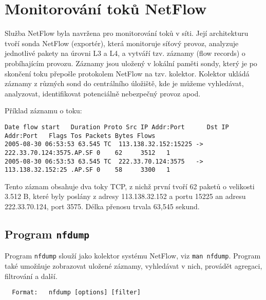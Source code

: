  \newpage
\section{Monitorování toků NetFlow}\label{netflow}
Služba NetFlow byla navržena pro monitorování toků v síti. Její architekturu tvoří sonda NetFlow (exportér), která monitoruje síťový provoz, analyzuje jednotlivé pakety na úrovni L3 a L4, a vytváří tzv. záznamy (flow records) o probíhajícím provozu. Záznamy jsou uložený v lokální paměti sondy, který je po skončení toku přepošle protokolem NetFlow na tzv. kolektor. Kolektor ukládá záznamy z různých sond do centrálního úložiště, kde je můžeme vyhledávat, analyzovat, identifikovat potenciálně nebezpečný provoz apod.

Příklad záznamu o toku:
{\footnotesize
\begin{verbatim}
Date flow start   Duration Proto Src IP Addr:Port      Dst IP Addr:Port   Flags Tos Packets Bytes Flows
2005-08-30 06:53:53 63.545 TC  113.138.32.152:15225 ->  222.33.70.124:3575.AP.SF 0    62     3512   1
2005-08-30 06:53:53 63.545 TC  222.33.70.124:3575   ->  113.138.32.152:25 .AP.SF 0    58     3300   1
\end{verbatim}
}
Tento záznam obsahuje dva toky TCP, z nichž první tvoří 62 paketů o velikosti 3.512 B, které byly poslány z adresy 113.138.32.152 a portu 15225 an adresu 222.33.70.124, port 3575. Délka přenosu trvala 63,545 sekund. 


\subsection{Program {\tt nfdump}}
Program {\tt nfdump} slouží jako kolektor systému NetFlow, viz {\tt man nfdump}. Program také umožňuje zobrazovat uložené záznamy, vyhledávat v nich, provádět agregaci, filtrování a další. 

\begin{verbatim}
  Format:   nfdump [options] [filter] 
\end{verbatim}

